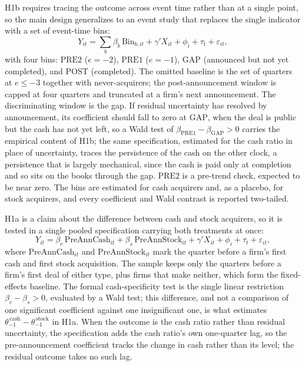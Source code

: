 H1b requires tracing the outcome across event time rather than at a single point, so the main design generalizes to an event study that replaces the single indicator with a set of event-time bins:
\begin{equation}
Y_{it} = \sum_{b}\beta_b\,\mathrm{Bin}_{b,it} + \gamma' X_{it} + \phi_i + \tau_t + \varepsilon_{it},
\end{equation}
with four bins: $\mathrm{PRE2}$ ($e=-2$), $\mathrm{PRE1}$ ($e=-1$), $\mathrm{GAP}$ (announced but not yet completed), and $\mathrm{POST}$ (completed). The omitted baseline is the set of quarters at $e\le -3$ together with never-acquirers; the post-announcement window is capped at four quarters and truncated at a firm's next announcement. The discriminating window is the gap. If residual uncertainty has resolved by announcement, its coefficient should fall to zero at $\mathrm{GAP}$, when the deal is public but the cash has not yet left, so a Wald test of $\beta_{\mathrm{PRE1}}-\beta_{\mathrm{GAP}}>0$ carries the empirical content of H1b; the same specification, estimated for the cash ratio in place of uncertainty, traces the persistence of the cash on the other clock, a persistence that is largely mechanical, since the cash is paid only at completion and so sits on the books through the gap. $\mathrm{PRE2}$ is a pre-trend check, expected to be near zero. The bins are estimated for cash acquirers and, as a placebo, for stock acquirers, and every coefficient and Wald contrast is reported two-tailed.

H1a is a claim about the difference between cash and stock acquirers, so it is tested in a single pooled specification carrying both treatments at once:
\begin{equation}
Y_{it} = \beta_c\,\mathrm{PreAnnCash}_{it} + \beta_s\,\mathrm{PreAnnStock}_{it} + \gamma' X_{it} + \phi_i + \tau_t + \varepsilon_{it},
\end{equation}
where $\mathrm{PreAnnCash}_{it}$ and $\mathrm{PreAnnStock}_{it}$ mark the quarter before a firm's first cash and first stock acquisition. The sample keeps only the quarters before a firm's first deal of either type, plus firms that make neither, which form the fixed-effects baseline. The formal cash-specificity test is the single linear restriction $\beta_c-\beta_s>0$, evaluated by a Wald test; this difference, and not a comparison of one significant coefficient against one insignificant one, is what estimates $\theta_{-1}^{\,\mathrm{cash}}-\theta_{-1}^{\,\mathrm{stock}}$ in H1a. When the outcome is the cash ratio rather than residual uncertainty, the specification adds the cash ratio's own one-quarter lag, so the pre-announcement coefficient tracks the change in cash rather than its level; the residual outcome takes no such lag.

